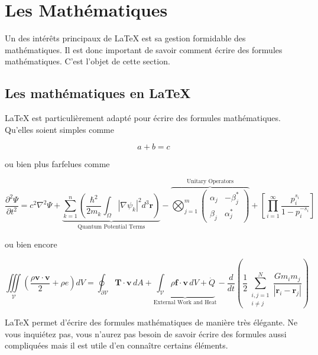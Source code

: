 \section{Les Mathématiques}\label{sec:math}
Un des intérêts principaux de LaTeX est sa gestion
formidable des mathématiques.
Il est donc important de savoir comment écrire des formules mathématiques.
C'est l'objet de cette section.

\subsection{Les mathématiques en LaTeX}\label{subsec:latex_math}

LaTeX est particulièrement adapté pour écrire des formules mathématiques.
Qu'elles soient simples comme

\begin{equation}
    a + b = c
\end{equation}

ou bien plus farfelues comme

\begin{equation}\label{eq:2}
\boxed{
\frac{\partial^2 \Psi}{\partial t^2} = c^2 \nabla^2 \Psi + \underbrace{\sum_{k=1}^n \left( \frac{\hbar^2}{2m_k} \int_{\Omega} |\nabla \psi_k|^2 d^3\mathbf{r} \right)}_{\text{Quantum Potential Terms}} - \overbrace{\bigotimes_{j=1}^m \begin{pmatrix}
\alpha_j & -\beta_j^* \\
\beta_j & \alpha_j^*
\end{pmatrix}}^{\text{Unitary Operators}} + \left[ \prod_{i=1}^\infty \frac{p_i^{s_i}}{1-p_i^{-s_i}} \right]
}
\end{equation}

ou bien encore

\begin{equation}\label{eq:3}
\iiint\limits_{\mathcal{V}} \left( \frac{\rho\mathbf{v} \cdot \mathbf{v}}{2} + \rho e \right) dV = \oint_{\partial \mathcal{V}} \mathbf{T} \cdot \mathbf{v} \, dA + \underbrace{\int_{\mathcal{V}} \rho \mathbf{f} \cdot \mathbf{v} \, dV + \dot{Q}}_{\text{External Work and Heat}} - \frac{d}{dt} \left( \frac{1}{2} \sum_{\substack{i,j=1 \\ i\neq j}}^{N} \frac{G m_i m_j}{|\mathbf{r}_i - \mathbf{r}_j|} \right)
\end{equation}

LaTeX permet d'écrire des formules mathématiques de manière très élégante.
Ne vous inquiétez pas, vous n'aurez pas besoin de savoir écrire des formules aussi compliquées
mais il est utile d'en connaître certains éléments.

